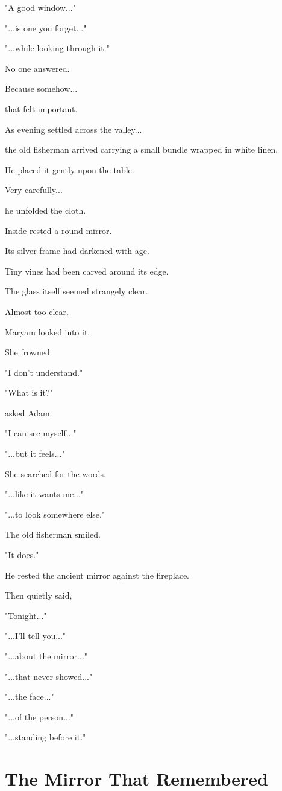 \documentclass[12pt,openany]{book}
\begin{document}
"A good window..."

"...is one you forget..."

"...while looking through it."

No one answered.

Because somehow...

that felt important.

As evening settled across the valley...

the old fisherman arrived carrying a small bundle wrapped in white linen.

He placed it gently upon the table.

Very carefully...

he unfolded the cloth.

Inside rested a round mirror.

Its silver frame had darkened with age.

Tiny vines had been carved around its edge.

The glass itself seemed strangely clear.

Almost too clear.

Maryam looked into it.

She frowned.

"I don't understand."

"What is it?"

asked Adam.

"I can see myself..."

"...but it feels..."

She searched for the words.

"...like it wants me..."

"...to look somewhere else."

The old fisherman smiled.

"It does."

He rested the ancient mirror against the fireplace.

Then quietly said,

"Tonight..."

"...I'll tell you..."

"...about the mirror..."

"...that never showed..."

"...the face..."

"...of the person..."

"...standing before it."
\section*{The Mirror That Remembered}
\end{document}

